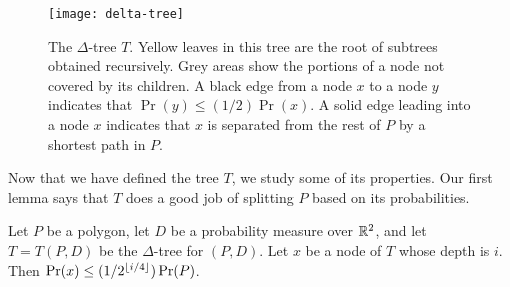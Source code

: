 \documentclass[lotsofwhite]{patmorin}
\begin{document}
\begin{figure}
 \begin{center}\texttt{[image: delta-tree]}\end{center}
   \caption{The $\Delta$-tree $T$.  Yellow leaves in this tree are the
     root of subtrees obtained recursively.  Grey areas show the
portions of a node not covered by its children. 
A black edge from a node $x$ to a node $y$ indicates that $\Pr(y)\le
(1/2)\Pr(x)$.  A solid edge leading into a node $x$ indicates that $x$
is separated from the rest of $P$ by a shortest path in $P$.}
\end{figure}

Now that we have defined the tree $T$, we study some of its
properties.  Our first lemma says that $T$ does a good job of
splitting $P$ based on its probabilities.

\begin{lem}
Let $P$ be a polygon, let $D$ be a probability measure over $\mathbb{R}^2$, 
and let $T=T(P,D)$ be the $\Delta$-tree for $(P,D)$.
Let $x$ be a node of $T$ whose depth is $i$. Then $\Pr(x) \le
(1/2^{{\left\lfloor i/4 \right\rfloor}})\Pr(P)$.
\end{lem}
\end{document}
